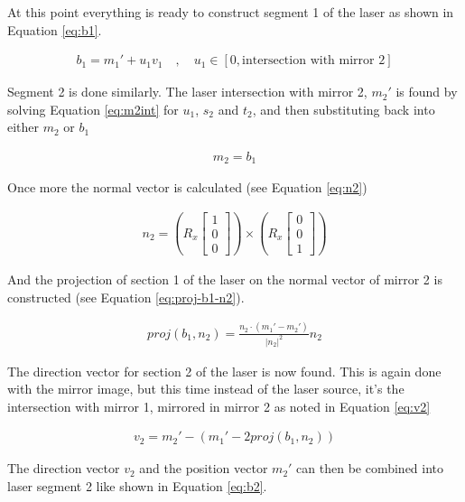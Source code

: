 At this point everything is ready to construct segment 1 of the laser as shown in Equation \ref{eq:b1}.

\begin{align}
    b_1 = m_1' + u_1 v_1 \quad , \quad u_1 \in [0, \text{intersection with mirror 2}] \label{eq:b1}
\end{align}

Segment 2 is done similarly. The laser intersection with mirror 2, $m_2'$ is found by solving Equation \ref{eq:m2int} for $u_1$, $s_2$ and $t_2$, and then substituting back into either $m_2$ or $b_1$

\begin{align}
    m_2 = b_1
    \label{eq:m2int}
\end{align}

Once more the normal vector is calculated (see Equation \ref{eq:n2})

\begin{align}
    n_2 = \left( R_x
    \begin{bmatrix}
        1 \\
        0 \\
        0
    \end{bmatrix} \right)
    \times
    \left( R_x
    \begin{bmatrix}
        0 \\
        0 \\
        1
    \end{bmatrix} \right)
    \label{eq:n2}
\end{align}

And the projection of section 1 of the laser on the normal vector of mirror 2 is constructed (see Equation \ref{eq:proj-b1-n2}).

\begin{align}
    proj(b_1, n_2) = \frac{n_2 \cdot (m_1' - m_2')}{|n_2|^2} n_2
    \label{eq:proj-b1-n2}
\end{align}

The direction vector for section 2 of the laser is now found. This is again done with the mirror image, but this time instead of the laser source, it's the intersection with mirror 1, mirrored in mirror 2 as noted in Equation \ref{eq:v2}

\begin{align}
    v_2 = m_2' - (m_1' - 2proj(b_1, n_2)) \label{eq:v2}
\end{align}

The direction vector $v_2$ and the position vector $m_2'$ can then be combined into laser segment 2 like shown in Equation \ref{eq:b2}.

